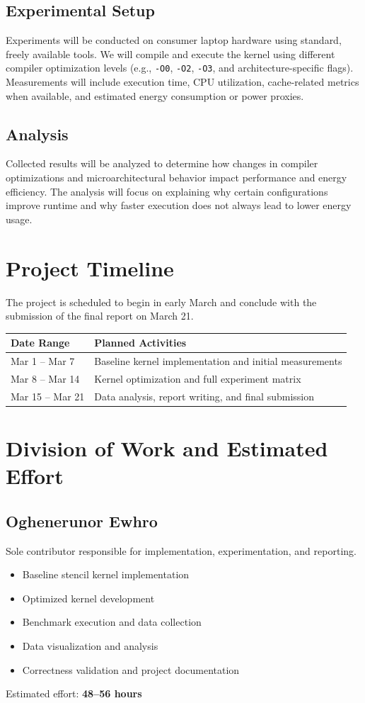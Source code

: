 \documentclass[11pt]{article}
\begin{document}
\subsection{Experimental Setup}
Experiments will be conducted on consumer laptop hardware using standard, freely available tools.
We will compile and execute the kernel using different compiler optimization levels (e.g., \texttt{-O0},
\texttt{-O2}, \texttt{-O3}, and architecture-specific flags). Measurements will include execution time,
CPU utilization, cache-related metrics when available, and estimated energy consumption or power
proxies.

\subsection{Analysis}
Collected results will be analyzed to determine how changes in compiler optimizations and
microarchitectural behavior impact performance and energy efficiency. The analysis will focus on
explaining why certain configurations improve runtime and why faster execution does not always
lead to lower energy usage.

\section{Project Timeline}
The project is scheduled to begin in early March and conclude with the submission of the final
report on March 21.

\begin{center}
\begin{tabular}{ll}
\toprule
\textbf{Date Range} & \textbf{Planned Activities} \\
\midrule
Mar 1 -- Mar 7  & Baseline kernel implementation and initial measurements \\
Mar 8 -- Mar 14 & Kernel optimization and full experiment matrix \\
Mar 15 -- Mar 21 & Data analysis, report writing, and final submission \\
\bottomrule
\end{tabular}
\end{center}

\section{Division of Work and Estimated Effort}

\subsection*{Oghenerunor Ewhro}
Sole contributor responsible for implementation, experimentation, and reporting.
\begin{itemize}
  \item Baseline stencil kernel implementation
  \item Optimized kernel development
  \item Benchmark execution and data collection
  \item Data visualization and analysis
  \item Correctness validation and project documentation
\end{itemize}
Estimated effort: \textbf{48--56 hours}
\end{document}
